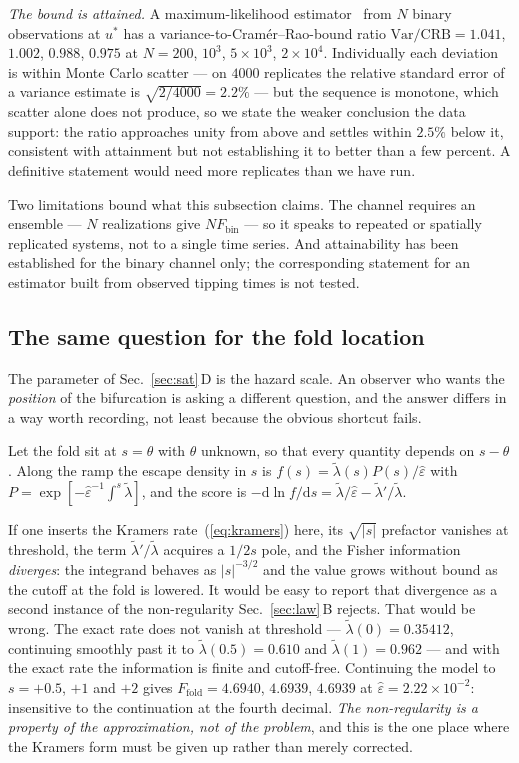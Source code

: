 \documentclass[%
 aip,
 cha,
 amsmath,amssymb,
 reprint,
 superscriptaddress,
 floatfix,
]{revtex4-2}
\newcommand{\dd}{\mathrm{d}}
\newcommand{\Sig}{\hat\varepsilon}
\begin{document}
\emph{The bound is attained.}  A maximum-likelihood estimator~\cite{LehmannCasella1998} from $N$ binary observations at $u^\ast$ has a variance-to-Cram\'er--Rao-bound ratio $\mathrm{Var}/\mathrm{CRB}=1.041$, $1.002$, $0.988$, $0.975$ at $N=200$, $10^3$, $5\times10^3$, $2\times10^4$.  Individually each deviation is within Monte Carlo scatter --- on $4000$ replicates the relative standard error of a variance estimate is $\sqrt{2/4000}=2.2\%$ --- but the sequence is monotone, which scatter alone does not produce, so we state the weaker conclusion the data support: the ratio approaches unity from above and settles within $2.5\%$ below it, consistent with attainment but not establishing it to better than a few percent.  A definitive statement would need more replicates than we have run.

Two limitations bound what this subsection claims.  The channel requires an ensemble --- $N$ realizations give $N F_{\mathrm{bin}}$ --- so it speaks to repeated or spatially replicated systems, not to a single time series.  And attainability has been established for the binary channel only; the corresponding statement for an estimator built from observed tipping times is not tested.

\subsection{\label{sec:foldloc}The same question for the fold location}

The parameter of Sec.~\ref{sec:sat}\,D is the hazard scale.  An observer who wants the \emph{position} of the bifurcation is asking a different question, and the answer differs in a way worth recording, not least because the obvious shortcut fails.

Let the fold sit at $s=\theta$ with $\theta$ unknown, so that every quantity depends on $s-\theta$.  Along the ramp the escape density in $s$ is $f(s)=\tilde\lambda(s)P(s)/\Sig$ with $P=\exp[-\Sig^{-1}\!\int^s\tilde\lambda]$, and the score is $-\dd\ln f/\dd s=\tilde\lambda/\Sig-\tilde\lambda'/\tilde\lambda$.

If one inserts the Kramers rate~(\ref{eq:kramers}) here, its $\sqrt{|s|}$ prefactor vanishes at threshold, the term $\tilde\lambda'/\tilde\lambda$ acquires a $1/2s$ pole, and the Fisher information \emph{diverges}: the integrand behaves as $|s|^{-3/2}$ and the value grows without bound as the cutoff at the fold is lowered.  It would be easy to report that divergence as a second instance of the non-regularity Sec.~\ref{sec:law}\,B rejects.  That would be wrong.  The exact rate does not vanish at threshold --- $\tilde\lambda(0)=0.35412$, continuing smoothly past it to $\tilde\lambda(0.5)=0.610$ and $\tilde\lambda(1)=0.962$ --- and with the exact rate the information is finite and cutoff-free.  Continuing the model to $s=+0.5$, $+1$ and $+2$ gives $F_{\mathrm{fold}}=4.6940$, $4.6939$, $4.6939$ at $\Sig=2.22\times10^{-2}$: insensitive to the continuation at the fourth decimal.  \emph{The non-regularity is a property of the approximation, not of the problem}, and this is the one place where the Kramers form must be given up rather than merely corrected.
\end{document}

